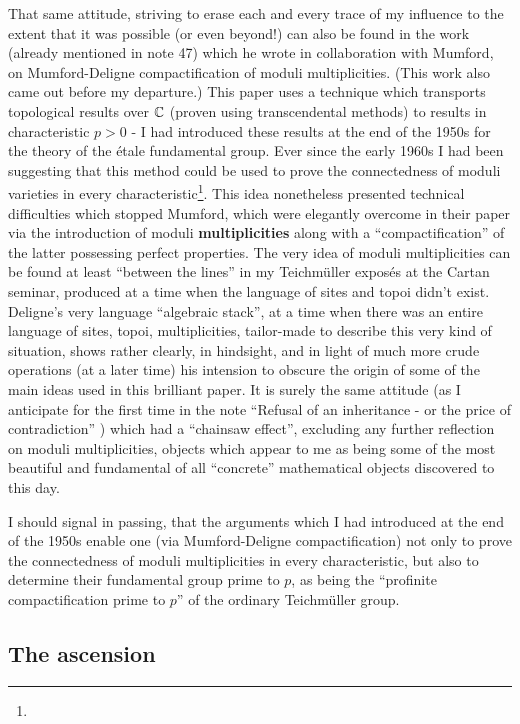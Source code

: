 That same attitude, striving to erase each and every trace of my influence to the extent
that it was possible (or even beyond!) can also be found in the work 
(already mentioned
in note 47)
which he wrote in collaboration with Mumford, on Mumford-Deligne compactification of 
moduli multiplicities.
(This work also came out before my departure.)
This paper uses a technique which transports topological results over $\mathbb{C}$ (proven using
transcendental methods) to results in characteristic $p > 0$
- I had introduced these results at the end of the 1950s for the theory of the \'etale
fundamental group. 
Ever since the early 1960s I had been suggesting that this method could be used to prove
the connectedness of moduli varieties in every characteristic\footnote{}.
This idea nonetheless presented technical difficulties which stopped Mumford,
which were elegantly overcome in their paper via the introduction of moduli
\textbf{multiplicities} along with a ``compactification'' of the latter possessing perfect
properties. The very idea of moduli multiplicities can be found at least ``between the
lines'' in my Teichm\"uller expos\'es at the Cartan seminar, produced at a time when the
language of sites and topoi didn't exist.
Deligne's very language ``algebraic stack'', at a time when there was an entire language
of sites, topoi, multiplicities, tailor-made 
to describe this very kind of situation, shows rather clearly, in hindsight, and in light
of much more crude operations (at a later time) 
his intension to obscure the origin of some of the main ideas 
used in this brilliant paper. It is surely the same attitude 
(as I anticipate for the first time in the note ``Refusal of an inheritance - or the price
of contradiction'' ) which had a ``chainsaw effect'', excluding any further
reflection on moduli multiplicities, objects which appear to me as being some of the most
beautiful and fundamental of all ``concrete'' mathematical objects discovered to this day. 

I should signal in passing, that the arguments which I had introduced at the end of the
1950s enable one (via Mumford-Deligne compactification) not only to prove the
connectedness of moduli multiplicities in every characteristic,
but also to determine their fundamental group prime to $p$, 
as being the ``profinite compactification prime to $p$''
of the ordinary Teichm\"uller group. 

\subsection{The ascension}

